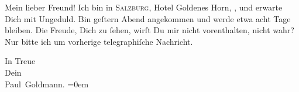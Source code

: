 \pstart\center{}Mein lieber Freund!\pend\vspace{0.5em}
\pstart
           Ich bin in \textsc{Salzburg}, Hotel Goldenes Horn, \label{K_L02715-1v}\label{K_L02715-1}, und erwarte Dich mit Ungeduld. Bin geſtern{ }Abend angekommen und werde etwa acht Tage bleiben. Die Freude, Dich zu{ }ſehen, wirſt Du mir nicht vorenthalten, nicht wahr? Nur bitte ich um vorherige
               telegraphiſche Nachricht.\pend
           
\pstart
           In Treue{\\[\baselineskip]}Dein {\\[\baselineskip]}\spacefill\mbox{Paul Goldmann.}\pend
           \leftskip=0em{}\endnumbering{}  \newcommand{\dateiname}{L02715}\newcommand{\titel}{Paul Goldmann an Arthur Schnitzler, 12. 9. 1893}\newcommand{\editorInnen}{Martin Anton Müller und Laura Untner}
